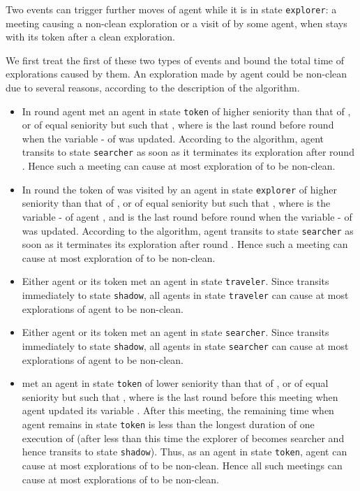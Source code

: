\documentclass[11pt]{article}
\newcommand{\qed}{\hfill  \bigbreak}
\newenvironment{proof}{\noindent {\bf Proof.}}{\qed}
\begin{document}
\begin{proof}
{Two events can trigger further moves of agent  while it is in state {\tt explorer}}: a meeting causing a non-clean exploration
  or a visit of  by some agent, when  stays with its token after a clean exploration. 
 
 We first treat the first of these two types of events and bound the total time of explorations caused by them.
 An exploration {made by agent } could be non-clean due to several reasons,
 according to the description of the algorithm.
 \begin{itemize}
 \item
{{In round } agent  met an agent  in state {\tt token} of higher seniority than that of , or of equal seniority but such
  that , {where  is the last round before round  when the variable - of  was updated.} According to the algorithm, agent  transits to state {\tt searcher} as soon as it terminates its exploration  after round . Hence such a meeting can cause at most  exploration  of  to be non-clean.}
\item
  {{In round  the token  of  was visited by an agent  in state {\tt explorer} of higher seniority than that of ,
     or of equal seniority but such that , where  is the variable - of agent , and  is the last round before round  when the variable - of  was updated. According to the algorithm, agent  transits to state {\tt searcher} as soon as it terminates its exploration  after round . Hence such a meeting can cause at most  exploration  of  to be non-clean.}}

     \item
     Either agent  or its token  met an agent  in state {\tt traveler}. Since  transits immediately to state {\tt shadow}, all agents in state {\tt traveler}
    {can cause at most  explorations  of agent  to be non-clean.}
       \item
     Either agent  or its token  met an agent  in state {\tt searcher}. Since  transits immediately to state {\tt shadow}, all agents in state {\tt searcher}
   {can cause at most  explorations  of agent  to be non-clean.}
   \item
  { met an agent   in state {\tt token} of lower seniority than that of , or of equal seniority but such that , where  is the last round before this meeting when agent  updated its variable . After this meeting,
   the remaining time when agent  remains in state {\tt token} is less than the longest duration of one execution of  (after less than this time the explorer of  becomes searcher and hence  transits to state {\tt shadow}). Thus, as an agent in state {\tt token}, agent  can cause at most  explorations  of  to be non-clean.
Hence all such meetings can cause at most  explorations  of  to be non-clean.} 
   

\end{itemize}
\end{proof}
\end{document}

